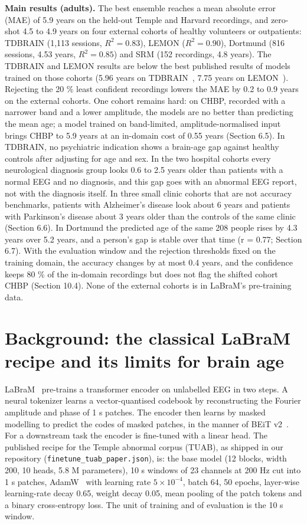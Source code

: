 \documentclass[11pt,a4paper]{article}
\begin{document}
\textbf{Main results (adults).} The best ensemble reaches a mean absolute error (MAE) of 5.9 years on the held-out Temple and Harvard recordings, and zero-shot 4.5 to 4.9 years on four external cohorts of healthy volunteers or outpatients: TDBRAIN (1,113 sessions, $R^2 = 0.83$), LEMON ($R^2 = 0.90$), Dortmund (816 sessions, 4.53 years, $R^2 = 0.85$) and SRM (152 recordings, 4.8 years). The TDBRAIN and LEMON results are below the best published results of models trained on those cohorts (5.96 years on TDBRAIN~\citep{khayretdinova2022tdbrain}, 7.75 years on LEMON~\citep{engemann2022benchmark}). Rejecting the 20 \% least confident recordings lowers the MAE by 0.2 to 0.9 years on the external cohorts. One cohort remains hard: on CHBP, recorded with a narrower band and a lower amplitude, the models are no better than predicting the mean age; a model trained on band-limited, amplitude-normalised input brings CHBP to 5.9 years at an in-domain cost of 0.55 years (Section 6.5). In TDBRAIN, no psychiatric indication shows a brain-age gap against healthy controls after adjusting for age and sex. In the two hospital cohorts every neurological diagnosis group looks 0.6 to 2.5 years older than patients with a normal EEG and no diagnosis, and this gap goes with an abnormal EEG report, not with the diagnosis itself. In three small clinic cohorts that are not accuracy benchmarks, patients with Alzheimer's disease look about 6 years and patients with Parkinson's disease about 3 years older than the controls of the same clinic (Section 6.6). In Dortmund the predicted age of the same 208 people rises by 4.3 years over 5.2 years, and a person's gap is stable over that time (r = 0.77; Section 6.7). With the evaluation window and the rejection thresholds fixed on the training domain, the accuracy changes by at most 0.4 years, and the confidence keeps 80 \% of the in-domain recordings but does not flag the shifted cohort CHBP (Section 10.4). None of the external cohorts is in LaBraM's pre-training data.

\section{Background: the classical LaBraM recipe and its limits for brain age}

LaBraM~\citep{jiang2024labram} pre-trains a transformer encoder on unlabelled EEG in two steps. A neural tokenizer learns a vector-quantised codebook by reconstructing the Fourier amplitude and phase of 1 s patches. The encoder then learns by masked modelling to predict the codes of masked patches, in the manner of BEiT v2~\citep{peng2022beitv2}. For a downstream task the encoder is fine-tuned with a linear head. The published recipe for the Temple abnormal corpus (TUAB), as shipped in our repository (\texttt{finetune\_tuab\_paper.json}), is: the base model (12 blocks, width 200, 10 heads, 5.8 M parameters), 10 s windows of 23 channels at 200 Hz cut into 1 s patches, AdamW~\citep{loshchilov2019adamw} with learning rate $5 \times 10^{-4}$, batch 64, 50 epochs, layer-wise learning-rate decay 0.65, weight decay 0.05, mean pooling of the patch tokens and a binary cross-entropy loss. The unit of training and of evaluation is the 10 s window.
\end{document}
